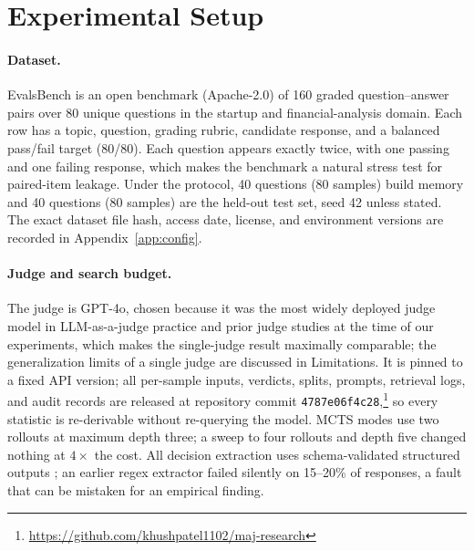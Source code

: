 \documentclass[]{ceurart}
\begin{document}
\section{Experimental Setup}
\label{sec:setup}

\paragraph{Dataset.} EvalsBench \citep{evalsbench2024} is an open benchmark (Apache-2.0) of 160 graded question--answer pairs over 80 unique questions in the startup and financial-analysis domain. Each row has a topic, question, grading rubric, candidate response, and a balanced pass/fail target (80/80). Each question appears exactly twice, with one passing and one failing response, which makes the benchmark a natural stress test for paired-item leakage. Under the protocol, 40 questions (80 samples) build memory and 40 questions (80 samples) are the held-out test set, seed 42 unless stated. The exact dataset file hash, access date, license, and environment versions are recorded in Appendix~\ref{app:config}.

\paragraph{Judge and search budget.} The judge is GPT-4o, chosen because it was the most widely deployed judge model in LLM-as-a-judge practice and prior judge studies at the time of our experiments, which makes the single-judge result maximally comparable; the generalization limits of a single judge are discussed in Limitations. It is pinned to a fixed API version; all per-sample inputs, verdicts, splits, prompts, retrieval logs, and audit records are released at repository commit \texttt{4787e06f4c28},\footnote{\url{https://github.com/khushpatel1102/maj-research}} so every statistic is re-derivable without re-querying the model. MCTS modes use two rollouts at maximum depth three; a sweep to four rollouts and depth five changed nothing at $4\times$ the cost. All decision extraction uses schema-validated structured outputs \citep{pydantic2024}; an earlier regex extractor failed silently on 15--20\% of responses, a fault that can be mistaken for an empirical finding.
\end{document}
